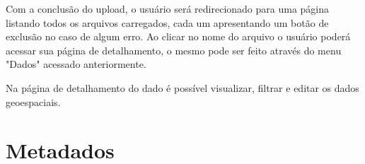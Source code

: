 \documentclass[12pt]{article}
\begin{document}
Com a conclusão do upload, o usuário será redirecionado para uma página
listando todos os arquivos carregados, cada um apresentando um botão de
exclusão no caso de algum erro. Ao clicar no nome do arquivo o usuário poderá
acessar sua página de detalhamento, o mesmo pode ser feito através do menu
"Dados" acessado anteriormente.

Na página de detalhamento do dado é possível visualizar, filtrar e editar os
dados geoespaciais.

\section{Metadados}







\end{document}
